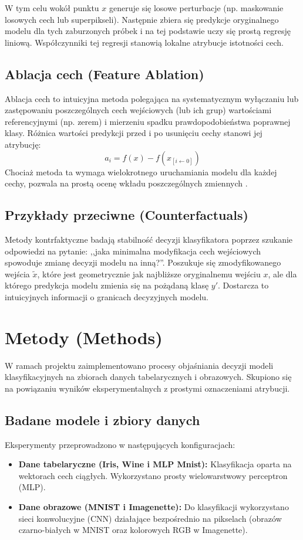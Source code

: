 \documentclass[10pt,journal,compsoc]{IEEEtran}
\begin{document}
W tym celu wokół punktu $x$ generuje się losowe perturbacje (np. maskowanie losowych cech lub superpikseli). Następnie zbiera się predykcje oryginalnego modelu dla tych zaburzonych próbek i na tej podstawie uczy się prostą regresję liniową. Współczynniki tej regresji stanowią lokalne atrybucje istotności cech.

\subsection{Ablacja cech (Feature Ablation)}
Ablacja cech to intuicyjna metoda polegająca na systematycznym wyłączaniu lub zastępowaniu poszczególnych cech wejściowych (lub ich grup) wartościami referencyjnymi (np. zerem) i mierzeniu spadku prawdopodobieństwa poprawnej klasy. Różnica wartości predykcji przed i po usunięciu cechy stanowi jej atrybucję:
\begin{equation}
a_i = f(x) - f(x_{[i \leftarrow 0]})
\end{equation}
Chociaż metoda ta wymaga wielokrotnego uruchamiania modelu dla każdej cechy, pozwala na prostą ocenę wkładu poszczególnych zmiennych \cite{Zeiler2014}.

\subsection{Przykłady przeciwne (Counterfactuals)}
Metody kontrfaktyczne \cite{Wachter2017} badają stabilność decyzji klasyfikatora poprzez szukanie odpowiedzi na pytanie: ,,jaka minimalna modyfikacja cech wejściowych spowoduje zmianę decyzji modelu na inną?''. Poszukuje się zmodyfikowanego wejścia $\tilde{x}$, które jest geometrycznie jak najbliższe oryginalnemu wejściu $x$, ale dla którego predykcja modelu zmienia się na pożądaną klasę $y'$. Dostarcza to intuicyjnych informacji o granicach decyzyjnych modelu.


\section{Metody (Methods)}
W ramach projektu zaimplementowano procesy objaśniania decyzji modeli klasyfikacyjnych na zbiorach danych tabelarycznych i obrazowych. Skupiono się na powiązaniu wyników eksperymentalnych z prostymi oznaczeniami atrybucji.

\subsection{Badane modele i zbiory danych}
Eksperymenty przeprowadzono w następujących konfiguracjach:
\begin{itemize}
    \item \textbf{Dane tabelaryczne (Iris, Wine i MLP Mnist):} Klasyfikacja oparta na wektorach cech ciągłych. Wykorzystano prosty wielowarstwowy perceptron (MLP).
    \item \textbf{Dane obrazowe (MNIST i Imagenette):} Do klasyfikacji wykorzystano sieci konwolucyjne (CNN) działające bezpośrednio na pikselach (obrazów czarno-białych w MNIST oraz kolorowych RGB w Imagenette).
\end{itemize}
\end{document}
